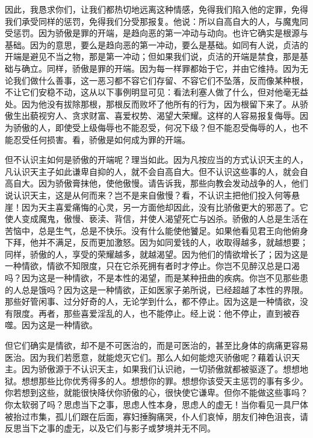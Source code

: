 因此，我恳求你们，让我们都热切地远离这种情感，免得我们陷入他的定罪，免得我们承受同样的惩罚，免得我们分受那报复。他说：所以自高自大的人，与魔鬼同受惩罚。因为骄傲是罪的开端，是趋向恶的第一冲动与动向。也许它确实是根源与基础。因为的意思，要么是趋向恶的第一冲动，要么是基础。如同有人说，贞洁的开端是避见不当之物，那是第一冲动；但如果我们说，贞洁的开端是禁食，那是基础与确立。同样，骄傲是罪的开端。因为每一样罪都始于它，并由它维持。因为无论我们做什么善事，这一恶习都不容它们存留、不容它们不坠落，反而像某种根，不让它们安稳不动，这从以下事例明显可见：看法利塞人做了什么，但对他毫无益处。因为他没有拔除那根，那根反而败坏了他所有的行为，因为根留下来了。从骄傲生出藐视穷人、贪求财富、喜爱权势、渴望大荣耀。这样的人容易报复侮辱。因为骄傲的人，即使受上级侮辱也不能忍受，何况下级？但不能忍受侮辱的人，也不能忍受任何损害。看，骄傲是如何成为罪的开端。\par

但不认识主如何是骄傲的开端呢？理当如此。因为凡按应当的方式认识天主的人，凡认识天主子如此谦卑自抑的人，就不会自高自大。但不认识这些事的人，就会自高自大。因为骄傲膏抹他，使他傲慢。请告诉我，那些向教会发动战争的人，他们说认识天主，这是从何而来？岂不是来自傲慢？看，不认识主把他们投入何等悬崖！因为天主喜爱痛悔的心灵，另一方面他却因此，没有比骄傲更大的邪恶了。它使人变成魔鬼，傲慢、亵渎、背信，并使人渴望死亡与凶杀。骄傲的人总是生活在苦恼中，总是生气，总是不快乐。没有什么能使他饕足。如果他看见君王向他俯身下拜，他并不满足，反而更加激怒。因为如同爱钱的人，收取得越多，就越想要；同样，骄傲的人，享受的荣耀越多，就越渴望。因为他们的情欲增长了；因为这是一种情欲，情欲不知限度，只在它杀死拥有者时才停止。你岂不见醉汉总是口渴吗？因为这是一种情欲，不是本性的渴望，而是某种扭曲的疾病。你岂不见那些患的人总是饿吗？因为这是一种情欲，正如医家子弟所说，已经超越了本性的界限。那些好管闲事、过分好奇的人，无论学到什么，都不停止。因为这是一种情欲，没有限度。再者，那些喜爱淫乱的人，也不能停止。经上说：他不停止，直到被吞噬。因为这是一种情欲。\par

但它们确实是情欲，却不是不可医治的，而是可医治的，甚至比身体的病痛更容易医治。因为我们若愿意，就能熄灭它们。那么人如何能熄灭骄傲呢？藉着认识天主。因为骄傲源于不认识天主，如果我们认识祂，一切骄傲就都被驱逐了。想想地狱。想想那些比你优秀得多的人。想想你的罪。想想你该受天主惩罚的事有多少。你若想到这些，就能很快降伏你骄傲的心，很快使它谦卑。但你不能做这些事吗？你太软弱了吗？思虑当下之事，思虑人性本身，思虑人的虚无！当你看见一具尸体被抬过市集，孤儿们跟在后面，寡妇捶胸痛哭，仆人们哀悼，朋友们神色沮丧，请反思当下之事的虚无，以及它们与影子或梦境并无不同。\par

